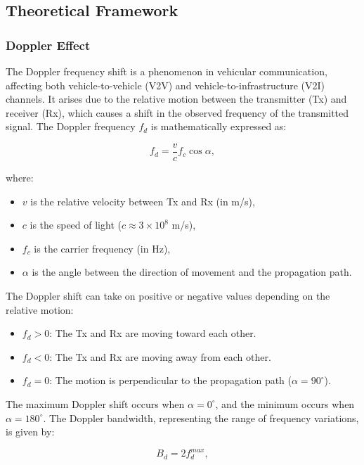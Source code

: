 \subsection{Theoretical Framework}

\subsubsection{Doppler Effect}
The Doppler frequency shift is a phenomenon in vehicular communication, affecting both vehicle-to-vehicle (V2V) and vehicle-to-infrastructure (V2I) channels. It arises due to the relative motion between the transmitter (Tx) and receiver (Rx), which causes a shift in the observed frequency of the transmitted signal. The Doppler frequency $f_d$ is mathematically expressed as:

\begin{equation}
f_d = \frac{v}{c} f_c \cos{\alpha},
\label{eq:doppler_shift}
\end{equation}

where:
\begin{itemize}
    \item $v$ is the relative velocity between Tx and Rx (in m/s),
    \item $c$ is the speed of light ($c \approx 3 \times 10^8$ m/s),
    \item $f_c$ is the carrier frequency (in Hz),
    \item $\alpha$ is the angle between the direction of movement and the propagation path.
\end{itemize}

The Doppler shift can take on positive or negative values depending on the relative motion:
\begin{itemize}
    \item $f_d > 0$: The Tx and Rx are moving toward each other.
    \item $f_d < 0$: The Tx and Rx are moving away from each other.
    \item $f_d = 0$: The motion is perpendicular to the propagation path ($\alpha = 90^\circ$).
\end{itemize}

The maximum Doppler shift occurs when $\alpha = 0^\circ$, and the minimum occurs when $\alpha = 180^\circ$. The Doppler bandwidth, representing the range of frequency variations, is given by:

\begin{equation}
B_d = 2 f_d^{max},
\label{eq:doppler_bandwidth}
\end{equation}

